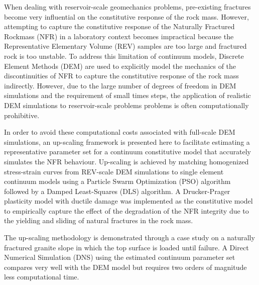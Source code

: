 When dealing with reservoir-scale geomechanics problems, pre-existing fractures become very influential on the constitutive response of the rock mass. However, attempting to capture the constitutive response of the Naturally Fractured Rockmass (NFR) in a laboratory context becomes impractical because the Representative Elementary Volume (REV) samples are too large and fractured rock is too unstable. To address this limitation of continuum models, Discrete Element Methods (DEM) are used to explicitly model the mechanics of the discontinuities of NFR to capture the constitutive response of the rock mass indirectly. However, due to the large number of degrees of freedom in DEM simulations and the requirement of small times steps, the application of realistic DEM simulations to reservoir-scale problems problems is often computationally prohibitive. 

In order to avoid these computational costs associated with full-scale DEM simulations, an up-scaling framework is presented here to facilitate estimating a representative parameter set for a continuum constitutive model that accurately simulates the NFR behaviour. Up-scaling is achieved by matching homogenized stress-strain curves from REV-scale DEM simulations to single element continuum models using a Particle Swarm Optimization (PSO) algorithm followed by a Damped Least-Squares (DLS) algorithm. A Drucker-Prager plasticity model with ductile damage was implemented as the constitutive model to empirically capture the effect of the degradation of the NFR integrity due to the yielding and sliding of natural fractures in the rock mass.

The up-scaling methodology is demonstrated through a case study on a naturally fractured granite slope in which the top surface is loaded until failure. A Direct Numerical Simulation (DNS) using the estimated continuum parameter set compares very well with the DEM model but requires two orders of magnitude less computational time.